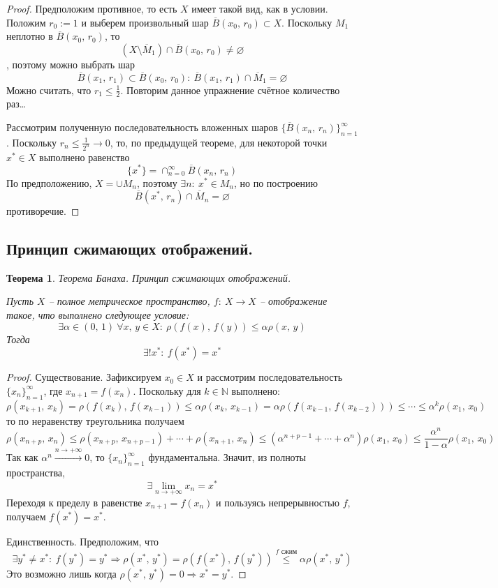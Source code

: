 \documentclass[a4paper,12pt]{article}
\renewcommand{\leq}{\ensuremath{\leqslant}}
\renewcommand{\emptyset}{\ensuremath{\varnothing}}
\theoremstyle{plain}
\newtheorem{theorem}{Теорема}[section]
\theoremstyle{definition}
\theoremstyle{remark}
\begin{document}
\begin{proof}
	Предположим противное, то есть $X$ имеет такой вид, как в условии. Положим $r_0 := 1$ и выберем произвольный шар $\overline{B}(x_0,\, r_0) \subset X$. Поскольку $M_1$ неплотно в $\overline{B}(x_0,\, r_0)$, то
	\[
		(X \setminus \overline{M}_1) \cap \overline{B}(x_0,\, r_0) \neq \emptyset
	\], поэтому можно выбрать шар
	\[
		\overline{B}(x_1,\, r_1) \subset \overline{B}(x_0,\, r_0) :\: \overline{B}(x_1,\, r_1) \cap \overline{M}_1 = \emptyset
	\]
	Можно считать, что $r_1 \leq \frac{1}{2}$. Повторим данное упражнение счётное количество раз\dots

	Рассмотрим полученную последовательность вложенных шаров $\{\overline{B}(x_n,\,r_n)\}_{n = 1}^\infty$. Поскольку $r_n \leq \frac{1}{2^n} \to 0$, то, по предыдущей теореме, для некоторой точки $x^* \in X$ выполнено равенство
	\[
		\{x^*\} = \cap_{n = 0}^\infty\overline{B}(x_n,\, r_n)
	\]
	По предположению, $X = \cup M_n$, поэтому $\exists n :\: x^* \in M_n$, но по построению
	\[
		\overline{B}(x^*,\, r_n) \cap \overline{M}_n = \emptyset
	\]
	противоречие.
\end{proof}

\subsection{Принцип сжимающих отображений.}
\begin{theorem}
	Теорема Банаха. Принцип сжимающих отображений.

	Пусть $X$ -- полное метрическое пространство, $f :\: X \to X$ -- отображение такое, что выполнено следующее условие:
	\[
		\exists \alpha \in (0,\, 1) \: \forall x,\, y \in X :\: \rho(f(x),\, f(y)) \leq \alpha\rho(x,\,y)
	\]
	Тогда
	\[
		\exists ! x^* :\: f(x^*) = x^*
	\]
\end{theorem}

\begin{proof}
	Существование. Зафиксируем $x_0 \in X$ и рассмотрим последовательность $\{x_n\}_{n = 1}^\infty$, где $x_{n + 1} = f(x_n)$. Поскольку для $k \in \mathbb{N}$ выполнено:
	\[
		\rho(x_{k + 1},\, x_k) = \rho(f(x_k),\, f(x_{k - 1})) \leq \alpha\rho(x_k,\, x_{k - 1}) = \alpha\rho(f(x_{k - 1},\, f(x_{k - 2}))) \leq \cdots \leq \alpha^k\rho(x_1,\, x_0)
	\]
	то по неравенству треугольника получаем
	\[
		\rho(x_{n + p},\, x_n) \leq \rho(x_{n + p},\, x_{n + p - 1}) + \cdots + \rho(x_{n + 1},\, x_n) \leq (\alpha^{n + p - 1} + \cdots + \alpha^n) \rho(x_1,\, x_0) \leq \frac{\alpha^n}{1 - \alpha}\rho(x_1,\, x_0)
	\]
	Так как $\alpha^n \overset{n \to +\infty}{\to} 0$, то $\{x_n\}_{n = 1}^\infty$ фундаментальна. Значит, из полноты пространства,
	\[
		\exists \lim_{n \to +\infty} x_n = x^*
	\]
	Переходя к пределу в равенстве $x_{n + 1} = f(x_n)$ и пользуясь непрерывностью $f$, получаем $f(x^*) = x^*$.

	Единственность. Предположим, что
	\[
		\exists y^* \neq x^* :\: f(y^*) = y^* \Rightarrow \rho(x^*,\, y^*) = \rho(f(x^*),\, f(y^*)) \overset{f \text{ сжим}}{\leq} \alpha\rho(x^*,\, y^*)
	\]
	Это возможно лишь когда $\rho(x^*,\, y^*) = 0 \Rightarrow x^* = y^*$.
\end{proof}
\end{document}
